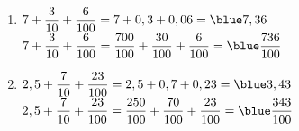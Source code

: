    \ \\ [-5mm]
   \begin{enumerate}
      \item $7+\dfrac{3}{10}+\dfrac{6}{100} = 7+0,3+0,06 ={\blue 7,36}$ \\ [2mm]
         $7+\dfrac{3}{10}+\dfrac{6}{100} =\dfrac{700}{100}+\dfrac{30}{100}+\dfrac{6}{100} ={\blue \dfrac{736}{100}}$ \medskip
      \item $2,5+\dfrac{7}{10}+\dfrac{23}{100} = 2,5+0,7+0,23 ={\blue 3,43}$ \\ [2mm]
         $2,5+\dfrac{7}{10}+\dfrac{23}{100} =\dfrac{250}{100}+\dfrac{70}{100}+\dfrac{23}{100} ={\blue \dfrac{343}{100}}$
   \end{enumerate}
